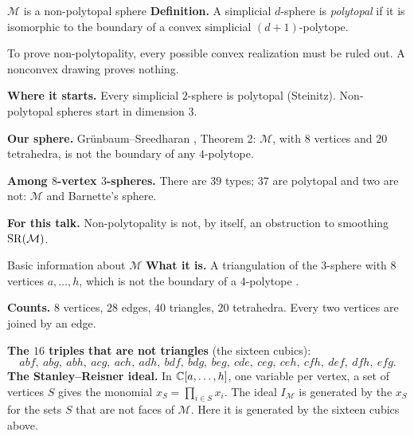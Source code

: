 \begin{frame}{\(\mathcal M\) is a non-polytopal sphere}
\textbf{Definition.} A simplicial \(d\)-sphere is \emph{polytopal} if it is isomorphic to the boundary of a convex simplicial \((d+1)\)-polytope.
\par\smallskip
To prove non-polytopality, every possible convex realization must be ruled out. A nonconvex drawing proves nothing.
\par\smallskip
\textbf{Where it starts.} Every simplicial \(2\)-sphere is polytopal (Steinitz). Non-polytopal spheres start in dimension \(3\).
\par\smallskip
\textbf{Our sphere.} Grünbaum--Sreedharan \cite{GS}, Theorem 2: \(\mathcal M\), with \(8\) vertices and \(20\) tetrahedra, is not the boundary of any \(4\)-polytope.
\par\medskip
\textbf{Among \(8\)-vertex \(3\)-spheres.} There are \(39\) types; \(37\) are polytopal and two are not: \(\mathcal M\) and Barnette's sphere.
\par\medskip
\textbf{For this talk.} Non-polytopality is not, by itself, an obstruction to smoothing \(\operatorname{SR}(\mathcal M)\).
\end{frame}

\begin{frame}{Basic information about \(\mathcal M\)}
\textbf{What it is.} A triangulation of the \(3\)-sphere with \(8\) vertices \(a,\dots,h\), which is not the boundary of a \(4\)-polytope \cite{GS}.
\par\medskip
\textbf{Counts.} \(8\) vertices, \(28\) edges, \(40\) triangles, \(20\) tetrahedra. Every two vertices are joined by an edge.
\par\medskip
\textbf{The \(16\) triples that are not triangles} (the sixteen cubics):
\[
abf,\ abg,\ abh,\ acg,\ ach,\ adh,\ bdf,\ bdg,\ beg,\ cde,\ ceg,\ ceh,\ cfh,\ def,\ dfh,\ efg.
\]
\textbf{The Stanley--Reisner ideal.} In \(\mathbb C[a,\dots,h]\), one variable per vertex, a set of vertices \(S\) gives the monomial \(x_S=\prod_{i\in S}x_i\). The ideal \(I_{\mathcal M}\) is generated by the \(x_S\) for the sets \(S\) that are not faces of \(\mathcal M\). Here it is generated by the sixteen cubics above.
\end{frame}


